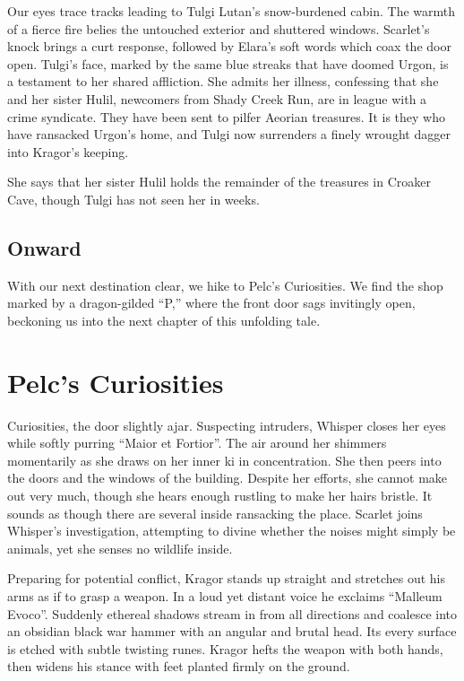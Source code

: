 \documentclass[
  letterpaper,12pt,twoside,twocolumn,openany,
  nodeprecatedcode,bg=full]{dndbook}
\begin{document}
Our eyes trace tracks leading to Tulgi Lutan's snow-burdened cabin. The
warmth of a fierce fire belies the untouched exterior and shuttered
windows. Scarlet's knock brings a curt response, followed by Elara's
soft words which coax the door open. Tulgi's face, marked by the same
blue streaks that have doomed Urgon, is a testament to her shared
affliction. She admits her illness, confessing that she and her sister
Hulil, newcomers from Shady Creek Run, are in league with a crime
syndicate. They have been sent to pilfer Aeorian treasures. It is they
who have ransacked Urgon's home, and Tulgi now surrenders a finely
wrought dagger into Kragor's keeping.

She says that her sister Hulil holds the remainder of the treasures in
Croaker Cave, though Tulgi has not seen her in weeks.

\section{Onward}\label{onward}

With our next destination clear, we hike to Pelc's Curiosities. We find
the shop marked by a dragon-gilded ``P,'' where the front door sags
invitingly open, beckoning us into the next chapter of this unfolding
tale.

\chapter{Pelc's Curiosities}\label{pelcs-curiosities}

 Curiosities, the door
slightly ajar. Suspecting intruders, Whisper closes her eyes while
softly purring ``Maior et Fortior''. The air around her shimmers
momentarily as she draws on her inner ki in concentration. She then
peers into the doors and the windows of the building. Despite her
efforts, she cannot make out very much, though she hears enough rustling
to make her hairs bristle. It sounds as though there are several inside
ransacking the place. Scarlet joins Whisper's investigation, attempting
to divine whether the noises might simply be animals, yet she senses no
wildlife inside.

Preparing for potential conflict, Kragor stands up straight and
stretches out his arms as if to grasp a weapon. In a loud yet distant
voice he exclaims ``Malleum Evoco''. Suddenly ethereal shadows stream in
from all directions and coalesce into an obsidian black war hammer with
an angular and brutal head. Its every surface is etched with subtle
twisting runes. Kragor hefts the weapon with both hands, then widens his
stance with feet planted firmly on the ground.
\end{document}
